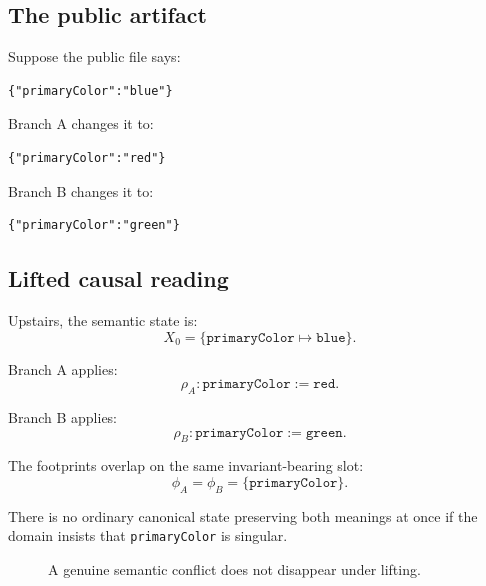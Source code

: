 \documentclass[11pt]{article}
\newcommand{\Conflict}{\ensuremath{\mathsf{Conflict}}}
\theoremstyle{definition}
\begin{document}
\subsection{The public artifact}

Suppose the public file says:

\begin{verbatim}
{"primaryColor":"blue"}
\end{verbatim}

Branch A changes it to:

\begin{verbatim}
{"primaryColor":"red"}
\end{verbatim}

Branch B changes it to:

\begin{verbatim}
{"primaryColor":"green"}
\end{verbatim}

\subsection{Lifted causal reading}

Upstairs, the semantic state is:
\[
X_0 = \{\texttt{primaryColor} \mapsto \texttt{blue}\}.
\]

Branch A applies:
\[
\rho_A : \texttt{primaryColor} := \texttt{red}.
\]

Branch B applies:
\[
\rho_B : \texttt{primaryColor} := \texttt{green}.
\]

The footprints overlap on the same invariant-bearing slot:
\[
\phi_A = \phi_B = \{\texttt{primaryColor}\}.
\]

There is no ordinary canonical state preserving both meanings at once if the
domain insists that \texttt{primaryColor} is singular.

\begin{figure}[h]
\centering
{}
\caption{A genuine semantic conflict does not disappear under lifting.}
\end{figure}
\end{document}
